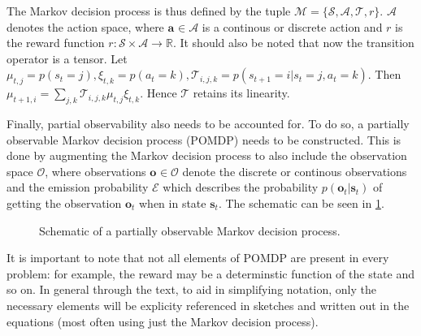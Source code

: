The Markov decision process is thus defined by the tuple
$ \mathcal{M} = \{\mathcal{S}, \mathcal{A}, \mathcal{T}, r\}  $.
$ \mathcal{A}  $ denotes the action space, where
$ \bm{a}_{} \in \mathcal{A}  $ is a continous or discrete action and
$ r  $ is the reward function $r : \mathcal{S} \times \mathcal{A} \to \mathbb{R}$.
It should also be noted that now the transition operator is a tensor.
Let $\mu_{t,j} = p(s_t = j), \xi_{t,k} = p(a_t = k), \mathcal{T}_{i,j,k} = p(s_{t+1} = i | s_t =j, a_t =k) $.
Then $\mu_{t+1,i} = \sum_{j,k}^{} \mathcal{T}_{i,j,k} \mu_{t,j} \xi_{t,k}$.
Hence $ \mathcal{T}  $ retains its linearity.

Finally, partial observability also needs to be accounted for.
To do so, a partially observable Markov decision process (POMDP) needs to be constructed.
This is done by augmenting the Markov decision process to also include
the observation space $ \mathcal{O}  $, where observations $ \bm{o}_{} \in \mathcal{O} $
denote the discrete or continous observations
and the emission probability $ \mathcal{E}  $ which describes the probability 
$ p(\bm{o}_{t} | \bm{s}_{t})  $ of getting the observation $ \bm{o}_{t}  $ when in state  $\bm{s}_{t}$.
The schematic can be seen in \ref{fig:pomdp}.

\begin{figure}[htpb]
\begin{center}
\end{center}
\caption{Schematic of a partially observable Markov decision process.}
\label{fig:pomdp}
\end{figure}
It is important to note that not all elements of POMDP are present in every problem: for example,
the reward may be a determinstic function of the state and so on.
In general through the text, to aid in simplifying notation, only the necessary elements will be explicity referenced
in sketches and written out in the equations (most often using just the Markov decision process).


